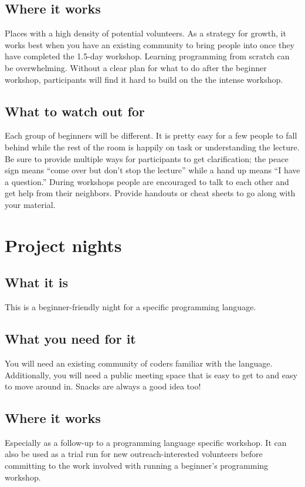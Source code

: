 \subsection{Where it works}
Places with a high density of potential volunteers. As a strategy for growth, it works best when you have an existing community to bring people into once they have completed the 1.5-day workshop. Learning programming from scratch can be overwhelming. Without a clear plan for what to do after the beginner workshop, participants will find it hard to build on the the intense workshop.

\subsection{What to watch out for}
Each group of beginners will be different. It is pretty easy for a few people to fall behind while the rest of the room is happily on task or understanding the lecture. Be sure to provide multiple ways for participants to get clarification; the peace sign means “come over but don’t stop the lecture” while a hand up means “I have a question.” During workshops people are encouraged to talk to each other and get help from their neighbors. Provide handouts or cheat sheets to go along with your material. 

\section{Project nights}
\subsection{What it is}
This is a beginner-friendly night for a specific programming language. 

\subsection{What you need for it}
You will need an existing community of coders familiar with the language. Additionally, you will need a public meeting space that is easy to get to and easy to move around in. Snacks are always a good idea too!

\subsection{Where it works}
Especially as a follow-up to a programming language specific workshop. It can also be used as a trial run for new outreach-interested volunteers before committing to the work involved with running a beginner’s programming workshop.

